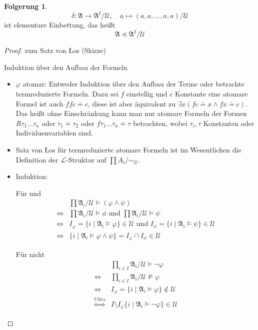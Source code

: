 \documentclass[12pt,parskip=full]{scrartcl}
\theoremstyle{definition}
\newtheorem{corollary}[theorem]{Folgerung}
\begin{document}
	\begin{corollary}
		\begin{equation*}
		 \delta: \mathfrak{A} \to \mathfrak{A}^I / \mathcal{U}, \quad a \mapsto (a,a, \dots, a,a)/ \mathcal{U}
		\end{equation*}
		ist elementare Einbettung, das heißt
		\begin{equation*}
			\mathfrak{A} \preccurlyeq \mathfrak{A}^I/\mathcal{U}
		\end{equation*}
	\end{corollary}

	\begin{proof} zum Satz von \L os (Skizze)
		
		Induktion über den Aufbau der Formeln
		
		\begin{itemize}
			\item $\varphi$ atomar: Entweder Induktion über den Aufbau der Terme oder betrachte termreduzierte Formeln. Dazu sei $f$ einstellig und $c$ Konstante eine atomare Formel ist auch $f f c \doteq c$, diese ist aber äquivalent zu $\exists x (f c \doteq x  \land f x \doteq c)$. Das heißt ohne Einschränkung kann man nur atomare Formeln der Formen $R \tau_1 \dots \tau_n$ oder $\tau_1 \doteq \tau_2$ oder $f \tau_1 \dots \tau_n \doteq \tau$ betrachten, wobei $\tau_i, \tau$ Konstanten oder Individuenvariablen sind.
			\item Satz von \L os für termreduzierte atomare Formeln ist im Wesentlichen die Definition der $\mathcal{L}$-Struktur auf $\prod A_i / \sim_\mathcal{U}$.
			\item Induktion:
			
			Für und
			\begin{align*}
				&\prod \mathfrak{A}_i / \mathcal{U} \models (\varphi \land \psi) \\
				\Leftrightarrow& \prod \mathfrak{A}_i / \mathcal{U} \models \phi \text{ und } \prod \mathfrak{A}_i / \mathcal{U} \models \psi \\
				\Leftrightarrow& I_\varphi = \{ i \mid \mathfrak{A}_i \models \varphi \} \in \mathcal{U} \text{ und } I_\psi = \{ i \mid \mathfrak{A}_i \models \psi\} \in \mathcal{U} \\
				\Leftrightarrow& \{ i \mid \mathfrak{A}_i \models \varphi \land \psi \} = I_\varphi \cap I_\psi \in \mathcal{U}
			\end{align*}
			
			Für nicht
			\begin{align*}
				&\prod_{i \in I} \mathfrak{A}_i / \mathcal{U} \models \lnot \varphi \\
				\Leftrightarrow& \prod_{i \in I} \mathfrak{A}_i / \mathcal{U} \not\models \varphi \\
				\Leftrightarrow& I_\varphi = \{ i \mid \mathfrak{A}_i \models \varphi \} \notin \mathcal{U} \\
				\overset{\text{Ultra}}{\Leftrightarrow}&  I \setminus I_\varphi \{ i \mid \mathfrak{A}_i \models \lnot \varphi \} \in \mathcal{U}
			\end{align*}
			

\end{itemize}
\end{proof}
\end{document}
